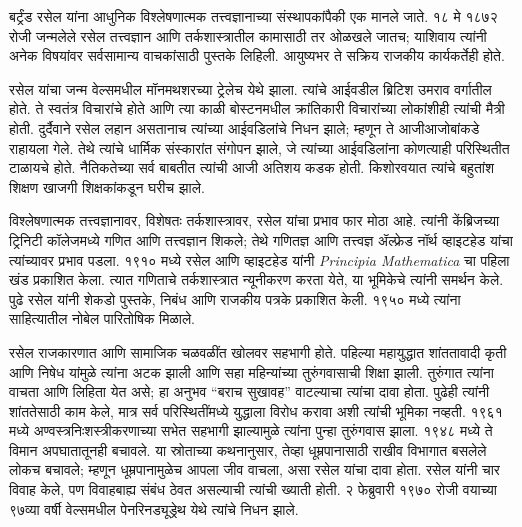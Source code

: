 \documentclass[../../../include/open-logic-section]{subfiles}
\begin{document}



बर्ट्रंड रसेल यांना आधुनिक विश्लेषणात्मक तत्त्वज्ञानाच्या संस्थापकांपैकी एक मानले जाते. १८ मे १८७२ रोजी जन्मलेले रसेल तत्त्वज्ञान आणि तर्कशास्त्रातील कामासाठी तर ओळखले जातच; याशिवाय त्यांनी अनेक विषयांवर सर्वसामान्य वाचकांसाठी पुस्तके लिहिली. आयुष्यभर ते सक्रिय राजकीय कार्यकर्तेही होते.

रसेल यांचा जन्म वेल्समधील मॉनमथशरच्या ट्रेलेच येथे झाला. त्यांचे आईवडील ब्रिटिश उमराव वर्गातील होते. ते स्वतंत्र विचारांचे होते आणि त्या काळी बोस्टनमधील क्रांतिकारी विचारांच्या लोकांशीही त्यांची मैत्री होती. दुर्दैवाने रसेल लहान असतानाच त्यांच्या आईवडिलांचे निधन झाले; म्हणून ते आजीआजोबांकडे राहायला गेले. तेथे त्यांचे धार्मिक संस्कारांत संगोपन झाले, जे त्यांच्या आईवडिलांना कोणत्याही परिस्थितीत टाळायचे होते. नैतिकतेच्या सर्व बाबतीत त्यांची आजी अतिशय कडक होती. किशोरवयात त्यांचे बहुतांश शिक्षण खाजगी शिक्षकांकडून घरीच झाले.

विश्लेषणात्मक तत्त्वज्ञानावर, विशेषतः तर्कशास्त्रावर, रसेल यांचा प्रभाव फार मोठा आहे. त्यांनी केंब्रिजच्या ट्रिनिटी कॉलेजमध्ये गणित आणि तत्त्वज्ञान शिकले; तेथे गणितज्ञ आणि तत्त्वज्ञ ॲल्फ्रेड नॉर्थ व्हाइटहेड यांचा त्यांच्यावर प्रभाव पडला. १९१० मध्ये रसेल आणि व्हाइटहेड यांनी \emph{Principia Mathematica} चा पहिला खंड प्रकाशित केला. त्यात गणिताचे तर्कशास्त्रात न्यूनीकरण करता येते, या भूमिकेचे त्यांनी समर्थन केले. पुढे रसेल यांनी शेकडो पुस्तके, निबंध आणि राजकीय पत्रके प्रकाशित केली. १९५० मध्ये त्यांना साहित्यातील नोबेल पारितोषिक मिळाले.

रसेल राजकारणात आणि सामाजिक चळवळींत खोलवर सहभागी होते. पहिल्या महायुद्धात शांततावादी कृती आणि निषेध यांमुळे त्यांना अटक झाली आणि सहा महिन्यांच्या तुरुंगवासाची शिक्षा झाली. तुरुंगात त्यांना वाचता आणि लिहिता येत असे; हा अनुभव “बराच सुखावह” वाटल्याचा त्यांचा दावा होता. पुढेही त्यांनी शांततेसाठी काम केले, मात्र सर्व परिस्थितींमध्ये युद्धाला विरोध करावा अशी त्यांची भूमिका नव्हती. १९६१ मध्ये अण्वस्त्रनिःशस्त्रीकरणाच्या सभेत सहभागी झाल्यामुळे त्यांना पुन्हा तुरुंगवास झाला. १९४८ मध्ये ते विमान अपघातातूनही बचावले. या स्रोताच्या कथनानुसार, तेव्हा धूम्रपानासाठी राखीव विभागात बसलेले लोकच बचावले; म्हणून धूम्रपानामुळेच आपला जीव वाचला, असा रसेल यांचा दावा होता. रसेल यांनी चार विवाह केले, पण विवाहबाह्य संबंध ठेवत असल्याची त्यांची ख्याती होती. २ फेब्रुवारी १९७० रोजी वयाच्या ९७व्या वर्षी वेल्समधील पेनरिनड्यूड्रेथ येथे त्यांचे निधन झाले.
\end{document}
